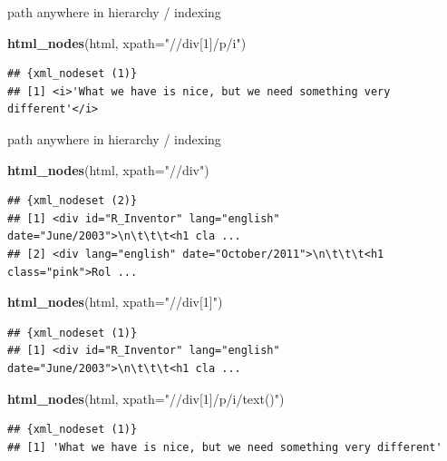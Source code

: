 \documentclass[ignorenonframetext,]{beamer}
\newenvironment{Shaded}{\begin{snugshade}}{\end{snugshade}}
\newcommand{\KeywordTok}[1]{\textcolor[rgb]{0.13,0.29,0.53}{\textbf{{#1}}}}
\newcommand{\DataTypeTok}[1]{\textcolor[rgb]{0.13,0.29,0.53}{{#1}}}
\newcommand{\StringTok}[1]{\textcolor[rgb]{0.31,0.60,0.02}{{#1}}}
\newcommand{\NormalTok}[1]{{#1}}
\begin{document}
\begin{frame}[fragile]{path anywhere in hierarchy / indexing}

\begin{Shaded}
\begin{Highlighting}[]
\KeywordTok{html_nodes}\NormalTok{(html, }\DataTypeTok{xpath=}\StringTok{"//div[1]/p/i"}\NormalTok{)}
\end{Highlighting}
\end{Shaded}

\begin{verbatim}
## {xml_nodeset (1)}
## [1] <i>'What we have is nice, but we need something very different'</i>
\end{verbatim}

\end{frame}

\begin{frame}[fragile]{path anywhere in hierarchy / indexing}

\begin{Shaded}
\begin{Highlighting}[]
\KeywordTok{html_nodes}\NormalTok{(html, }\DataTypeTok{xpath=}\StringTok{"//div"}\NormalTok{)}
\end{Highlighting}
\end{Shaded}

\begin{verbatim}
## {xml_nodeset (2)}
## [1] <div id="R_Inventor" lang="english" date="June/2003">\n\t\t\t<h1 cla ...
## [2] <div lang="english" date="October/2011">\n\t\t\t<h1 class="pink">Rol ...
\end{verbatim}

\begin{Shaded}
\begin{Highlighting}[]
\KeywordTok{html_nodes}\NormalTok{(html, }\DataTypeTok{xpath=}\StringTok{"//div[1]"}\NormalTok{)}
\end{Highlighting}
\end{Shaded}

\begin{verbatim}
## {xml_nodeset (1)}
## [1] <div id="R_Inventor" lang="english" date="June/2003">\n\t\t\t<h1 cla ...
\end{verbatim}

\begin{Shaded}
\begin{Highlighting}[]
\KeywordTok{html_nodes}\NormalTok{(html, }\DataTypeTok{xpath=}\StringTok{"//div[1]/p/i/text()"}\NormalTok{)}
\end{Highlighting}
\end{Shaded}

\begin{verbatim}
## {xml_nodeset (1)}
## [1] 'What we have is nice, but we need something very different'
\end{verbatim}

\end{frame}
\end{document}
